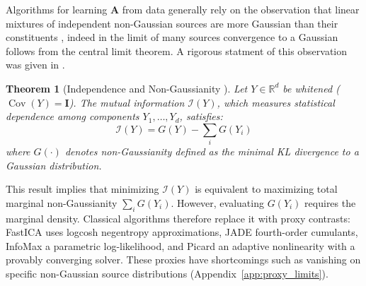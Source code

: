 \documentclass{tpm2026} %
\newtheorem{theorem}{Theorem}
\begin{document}
Algorithms for learning $\mathbf{A}$ from data generally rely on the observation that linear mixtures of independent non-Gaussian sources are more Gaussian than their constituents \citep{hyvarinen2001}, indeed in the limit of many sources convergence to a Gaussian follows from the central limit theorem.
A rigorous statment of this observation was given in \citet{cardoso2022}.

\begin{theorem}[Independence and Non-Gaussianity \citep{cardoso2022}]
Let $Y \in \mathbb{R}^d$ be whitened ($\operatorname{Cov}(Y)=\mathbf{I}$). The mutual information $\mathscr{I}(Y)$, which measures statistical dependence among components $Y_1,\ldots,Y_d$, satisfies:
\begin{equation}
    \mathscr{I}(Y) = G(Y) - \sum_{i} G(Y_i)
\end{equation}
where $G(\cdot)$ denotes non-Gaussianity defined as the minimal KL divergence to a Gaussian distribution. 
\end{theorem}
This result implies that
minimizing $\mathscr{I}(Y)$  is equivalent to maximizing total marginal non-Gaussianity $\sum_i G(Y_i)$.
However, evaluating $G(Y_i)$ requires the marginal density. Classical algorithms therefore replace it with proxy contrasts:
FastICA \citep{hyvarinen2001, amari1996new} uses logcosh negentropy approximations, 
JADE \citep{cardoso1993blind} fourth-order cumulants, 
InfoMax \citep{bell1995information} a parametric log-likelihood, and 
Picard \citep{ablin2018faster} an adaptive nonlinearity with a provably converging solver. These proxies have shortcomings such as vanishing on   specific non-Gaussian source distributions (Appendix~\ref{app:proxy_limits}).
\end{document}
